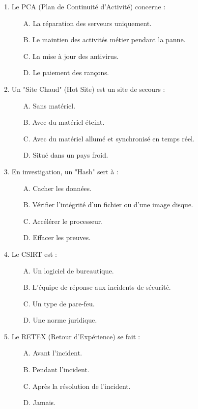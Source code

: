 \begin{enumerate}
    \item Le PCA (Plan de Continuité d'Activité) concerne :
    \begin{itemize}
        \item[A.] La réparation des serveurs uniquement.
        \item[B.] Le maintien des activités métier pendant la panne.
        \item[C.] La mise à jour des antivirus.
        \item[D.] Le paiement des rançons.
    \end{itemize}

    \item Un "Site Chaud" (Hot Site) est un site de secours :
    \begin{itemize}
        \item[A.] Sans matériel.
        \item[B.] Avec du matériel éteint.
        \item[C.] Avec du matériel allumé et synchronisé en temps réel.
        \item[D.] Situé dans un pays froid.
    \end{itemize}

    \item En investigation, un "Hash" sert à :
    \begin{itemize}
        \item[A.] Cacher les données.
        \item[B.] Vérifier l'intégrité d'un fichier ou d'une image disque.
        \item[C.] Accélérer le processeur.
        \item[D.] Effacer les preuves.
    \end{itemize}

    \item Le CSIRT est :
    \begin{itemize}
        \item[A.] Un logiciel de bureautique.
        \item[B.] L'équipe de réponse aux incidents de sécurité.
        \item[C.] Un type de pare-feu.
        \item[D.] Une norme juridique.
    \end{itemize}

    \item Le RETEX (Retour d'Expérience) se fait :
    \begin{itemize}
        \item[A.] Avant l'incident.
        \item[B.] Pendant l'incident.
        \item[C.] Après la résolution de l'incident.
        \item[D.] Jamais.
    \end{itemize}


\end{enumerate}
